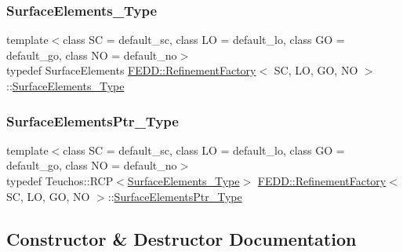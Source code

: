 \subsubsection{\texorpdfstring{Surface\+Elements\+\_\+\+Type}{SurfaceElements\_Type}}
{\footnotesize\ttfamily template$<$class SC = default\+\_\+sc, class LO = default\+\_\+lo, class GO = default\+\_\+go, class NO = default\+\_\+no$>$ \\
typedef Surface\+Elements \hyperlink{classFEDD_1_1RefinementFactory}{F\+E\+D\+D\+::\+Refinement\+Factory}$<$ SC, LO, GO, NO $>$\+::\hyperlink{classFEDD_1_1RefinementFactory_ac050bc27156fc5a1e8bf0e01381c33c4}{Surface\+Elements\+\_\+\+Type}}

\mbox{\label{classFEDD_1_1RefinementFactory_a1067ba23325b19eae16a864f25f7d68f}} 
\subsubsection{\texorpdfstring{Surface\+Elements\+Ptr\+\_\+\+Type}{SurfaceElementsPtr\_Type}}
{\footnotesize\ttfamily template$<$class SC = default\+\_\+sc, class LO = default\+\_\+lo, class GO = default\+\_\+go, class NO = default\+\_\+no$>$ \\
typedef Teuchos\+::\+R\+CP$<$\hyperlink{classFEDD_1_1RefinementFactory_ac050bc27156fc5a1e8bf0e01381c33c4}{Surface\+Elements\+\_\+\+Type}$>$ \hyperlink{classFEDD_1_1RefinementFactory}{F\+E\+D\+D\+::\+Refinement\+Factory}$<$ SC, LO, GO, NO $>$\+::\hyperlink{classFEDD_1_1RefinementFactory_a1067ba23325b19eae16a864f25f7d68f}{Surface\+Elements\+Ptr\+\_\+\+Type}}



\subsection{Constructor \& Destructor Documentation}
\mbox{\label{classFEDD_1_1RefinementFactory_a45a83da1b5be5f4bcb091cf56caca25e}} 
